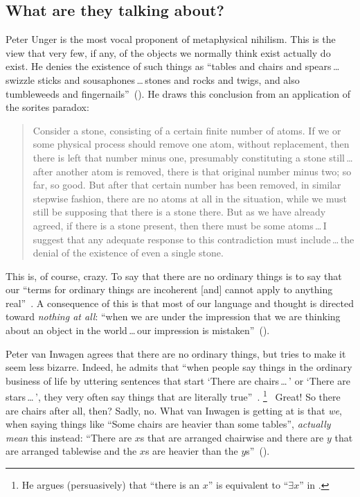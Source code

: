 \documentclass[11pt]{article}
\newenvironment{squote}{\begin{quote}\begin{singlespace}}{\end{singlespace}\end{quote}}
\begin{document}
\begin{spacing}{1.5}
\subsection{What are they talking about?}
Peter Unger is the most vocal proponent of metaphysical nihilism. This is the view that very few, if any, of the objects we normally think exist actually do exist. He denies the existence of such things as ``tables and chairs and spears\,\ldots\,swizzle sticks and sousaphones\,\ldots\,stones and rocks and twigs, and also tumbleweeds and fingernails''~(\citeyear[117]{unger1979}). He draws this conclusion from an application of the sorites paradox:
\begin{squote}
Consider a stone, consisting of a certain finite number of atoms. If we or some physical process should remove one atom, without replacement, then there is left that number minus one, presumably constituting a stone still\,\ldots\,after another atom is removed, there is that original number minus two; so far, so good. But after that certain number has been removed, in similar stepwise fashion, there are no atoms at all in the situation, while we must still be supposing that there is a stone there. But as we have already agreed, if there is a stone present, then there must
be some atoms\,\ldots\,I suggest that any adequate response to this contradiction must include\,\ldots\,the denial of the existence of even a single stone.~\citep[121--122]{unger1979}
\end{squote}
This is, of course, crazy. To say that there are no ordinary things is to say that our ``terms for ordinary things are incoherent [and] cannot apply to anything real''~\citep[147]{unger1979}. A consequence of this is that most of our language and thought is directed toward {\em nothing at all}: ``when we are under the impression that we are thinking about an object in the world\,\ldots\,our impression is mistaken''~(\citeyear[149]{unger1979}).

Peter van Inwagen agrees that there are no ordinary things, but tries to make it seem less bizarre. Indeed, he admits that ``when people say things in the ordinary business of life by uttering sentences that start `There are chairs\,\ldots\,' or `There are stars\,\ldots\,', they very often say things that are literally true''~\cite[102]{inwagen1995}.%
%
\footnote{He argues (persuasively) that ``there is an $x$'' is equivalent to ``$\exists x$'' in \citet{inwagen1998}.}%
%
\ Great! So there are chairs after all, then? Sadly, no. What van Inwagen is getting at is that {\em we}, when saying things like ``Some chairs are heavier than some tables'', {\em actually mean} this instead: ``There are $x$s that are arranged chairwise and there are $y$ that are arranged tablewise and the $x$s are heavier than the $y$s''~(\citeyear[109]{inwagen1995}).


\end{spacing}
\end{document}
